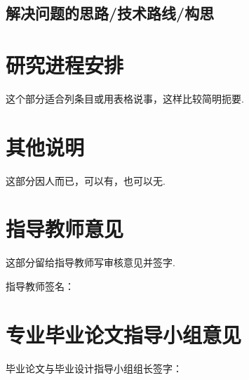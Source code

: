 \documentclass{proposal}
\begin{document}
\zhlipsum[1]

\subsection{解决问题的思路/技术路线/构思}

\zhlipsum[1]

\SectionEndLine				   %
\section{研究进程安排}

这个部分适合列条目或用表格说事，这样比较简明扼要.



\SectionEndLine				   %
\section{其他说明}

这部分因人而已，可以有，也可以无.


\SectionEndLine				   %
\section{指导教师意见}

这部分留给指导教师写审核意见并签字. 
\begin{flushright}
	指导教师签名：\makebox[6em][l]{\leaderSign}\\
	\leaderSignDate
\end{flushright}



\SectionEndLine				   %
\section{专业毕业论文指导小组意见}
\vspace*{5cm}


\begin{flushright}
	毕业论文与毕业设计指导小组组长签字：\makebox[6em][l]{\leaderSign}\\
	\leaderSignDate
\end{flushright}
\end{document}
